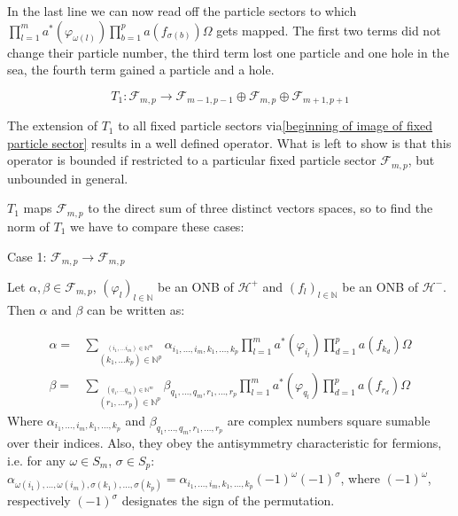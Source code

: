 \documentclass[a4paper,12pt]{article}
\begin{document}
In the last line we can now read off the particle sectors to which \(\prod_{l=1}^m a^*(\varphi_{\omega(l)}) \prod_{b=1}^p a(f_{\sigma(b)}) \Omega\) gets mapped. The first two terms did not change their particle number, the third term lost one particle and one hole in the sea, the fourth term gained a particle and a hole.

\begin{equation}
T_1: \mathcal{F}_{m,p}\rightarrow \mathcal{F}_{m-1,p-1} \oplus \mathcal{F}_{m,p} \oplus \mathcal{F}_{m+1,p+1}
\end{equation}

The extension of \(T_1\) to all fixed particle sectors via\eqref{beginning of image of fixed particle sector} results in a well defined operator. What is left to show is that this operator is bounded if restricted to a particular fixed particle sector \(\mathcal{F}_{m,p}\), but unbounded in general.

\(T_1\) maps \(\mathcal{F}_{m,p}\) to the direct sum of three distinct vectors spaces, so to find the norm of \(T_1\) we have to compare these cases:

\vspace{1cm}
\begin{center}
{\Large Case 1:} \( \mathcal{F}_{m,p}\rightarrow \mathcal{F}_{m,p} \)
\end{center}
Let \(\alpha, \beta \in \mathcal{F}_{m,p}\), \( (\varphi_l )_{l\in \mathbb{N}} \) be an ONB of \(\mathcal{H}^+\) and \( (f_l )_{l\in \mathbb{N}} \) be an ONB of \(\mathcal{H}^-\). Then \(\alpha\) and \(\beta\) can be written as:

\begin{equation}
\begin{aligned}
\alpha=&\sum_{\stackrel{(i_1,\dots i_m)\in \mathbb{N}^m}{(k_1,\dots k_p)\in \mathbb{N}^p}} \alpha_{i_1,\dots, i_m, k_1, \dots, k_p} \prod_{l=1}^m a^*(\varphi_{i_l}) \prod_{d=1}^p a(f_{k_d})\Omega
\\
\beta=&\sum_{\stackrel{(q_1,\dots q_m)\in \mathbb{N}^m}{(r_1,\dots r_p)\in \mathbb{N}^p}} \beta_{q_1,\dots, q_m, r_1, \dots, r_p} \prod_{l=1}^m a^*(\varphi_{q_l}) \prod_{d=1}^p a(f_{r_d})\Omega
\end{aligned}
\end{equation} 
Where  \(\alpha_{i_1,\dots, i_m, k_1, \dots, k_p}\) and \(\beta_{q_1,\dots, q_m, r_1, \dots, r_p}\) are complex numbers square sumable over their indices. Also, they obey the antisymmetry characteristic for fermions, i.e. for any \(\omega \in S_m\), \(\sigma \in S_p\): \( \alpha_{\omega(i_1),\dots, \omega(i_m), \sigma(k_1), \dots, \sigma(k_p)}=\alpha_{i_1,\dots, i_m, k_1, \dots, k_p} (-1)^\omega (-1)^\sigma\), where \((-1)^\omega\), respectively \((-1)^\sigma\) designates the sign of the permutation.
\end{document}
